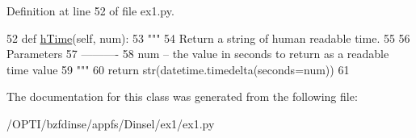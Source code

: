 Definition at line 52 of file ex1.\+py.


\begin{DoxyCode}
52     \textcolor{keyword}{def }\hyperlink{classex1_1_1ex1_a1bc2508f80651d0806b57abe1e932f13}{hTime}(self, num):
53         \textcolor{stringliteral}{"""}
54 \textcolor{stringliteral}{        Return a string of human readable time.}
55 \textcolor{stringliteral}{}
56 \textcolor{stringliteral}{        Parameters}
57 \textcolor{stringliteral}{        ----------}
58 \textcolor{stringliteral}{        num -- the value in seconds to return as a readable time value}
59 \textcolor{stringliteral}{        """}
60         \textcolor{keywordflow}{return} str(datetime.timedelta(seconds=num))
61 
\end{DoxyCode}


The documentation for this class was generated from the following file\+:\begin{DoxyCompactItemize}
\item 
/\+O\+P\+T\+I/bzfdinse/appfs/\+Dinsel/ex1/ex1.\+py\end{DoxyCompactItemize}
